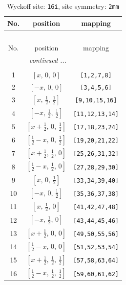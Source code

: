 \documentclass[fleqn,8pt]{jsarticle}
\begin{document}
\begin{longtable}{ccc}
\caption{Wyckoff site: {\tt 16i}, site symmetry: {\tt 2mm}}
 \\
 \hline \hline
No. & position & mapping \\ \hline \endfirsthead

\multicolumn{2}{l}{\tablename\ \thetable{}} \\
 \hline \hline
No. & position & mapping \\ \hline \endhead

 \hline \hline
\multicolumn{2}{r}{\footnotesize\it continued ...} \\ \endfoot

 \hline \hline
\multicolumn{2}{r}{} \\ \endlastfoot

1 & $\left[ x,\, 0,\, 0 \right]$ & {\tt [1,2,7,8]} \\ \hline
2 & $\left[ - x,\, 0,\, 0 \right]$ & {\tt [3,4,5,6]} \\ \hline
3 & $\left[ x,\, \frac{1}{2},\, \frac{1}{2} \right]$ & {\tt [9,10,15,16]} \\ \hline
4 & $\left[ - x,\, \frac{1}{2},\, \frac{1}{2} \right]$ & {\tt [11,12,13,14]} \\ \hline
5 & $\left[ x + \frac{1}{2},\, 0,\, \frac{1}{2} \right]$ & {\tt [17,18,23,24]} \\ \hline
6 & $\left[ \frac{1}{2} - x,\, 0,\, \frac{1}{2} \right]$ & {\tt [19,20,21,22]} \\ \hline
7 & $\left[ x + \frac{1}{2},\, \frac{1}{2},\, 0 \right]$ & {\tt [25,26,31,32]} \\ \hline
8 & $\left[ \frac{1}{2} - x,\, \frac{1}{2},\, 0 \right]$ & {\tt [27,28,29,30]} \\ \hline
9 & $\left[ x,\, 0,\, \frac{1}{2} \right]$ & {\tt [33,34,39,40]} \\ \hline
10 & $\left[ - x,\, 0,\, \frac{1}{2} \right]$ & {\tt [35,36,37,38]} \\ \hline
11 & $\left[ x,\, \frac{1}{2},\, 0 \right]$ & {\tt [41,42,47,48]} \\ \hline
12 & $\left[ - x,\, \frac{1}{2},\, 0 \right]$ & {\tt [43,44,45,46]} \\ \hline
13 & $\left[ x + \frac{1}{2},\, 0,\, 0 \right]$ & {\tt [49,50,55,56]} \\ \hline
14 & $\left[ \frac{1}{2} - x,\, 0,\, 0 \right]$ & {\tt [51,52,53,54]} \\ \hline
15 & $\left[ x + \frac{1}{2},\, \frac{1}{2},\, \frac{1}{2} \right]$ & {\tt [57,58,63,64]} \\ \hline
16 & $\left[ \frac{1}{2} - x,\, \frac{1}{2},\, \frac{1}{2} \right]$ & {\tt [59,60,61,62]} \\
\end{longtable}
\end{document}
